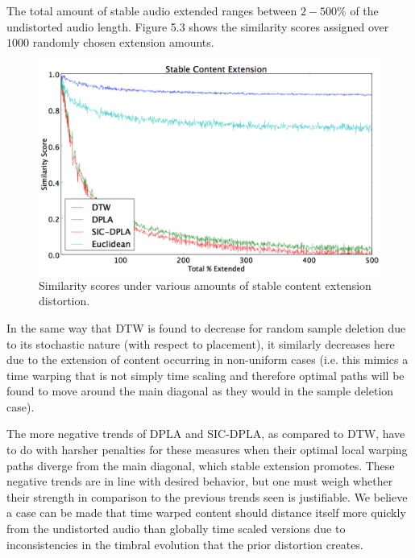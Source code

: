 \documentclass[12pt]{report} 	%
\numberwithin{figure}{chapter}
\numberwithin{table}{chapter}
\numberwithin{equation}{chapter}
\begin{document}
\begin{flushleft}
The total amount of stable audio extended ranges between $2-500\%$ of the undistorted audio length. Figure 5.3 shows the similarity scores assigned over $1000$ randomly chosen extension amounts.

\begin{figure}[h!]
\begin{center}
\includegraphics[scale=0.5,width=\linewidth]{StableExtension}
\caption[Extension of stable timbral content results]{Similarity scores under various amounts of stable content extension distortion.}
\end{center}
\end{figure}
In the same way that DTW is found to decrease for random sample deletion due to its stochastic nature (with respect to placement), it similarly decreases here due to the extension of content occurring in non-uniform cases (i.e. this mimics a time warping that is not simply time scaling and therefore optimal paths will be found to move around the main diagonal as they would in the sample deletion case). 

The more negative trends of DPLA and SIC-DPLA, as compared to DTW, have to do with harsher penalties for these measures when their optimal local warping paths diverge from the main diagonal, which stable extension promotes. These negative trends are in line with desired behavior, but one must weigh whether their strength in comparison to the previous trends seen is justifiable. We believe a case can be made that time warped content should distance itself more quickly from the undistorted audio than globally time scaled versions due to inconsistencies in the timbral evolution that the prior distortion creates. 


\end{flushleft}
\end{document}
